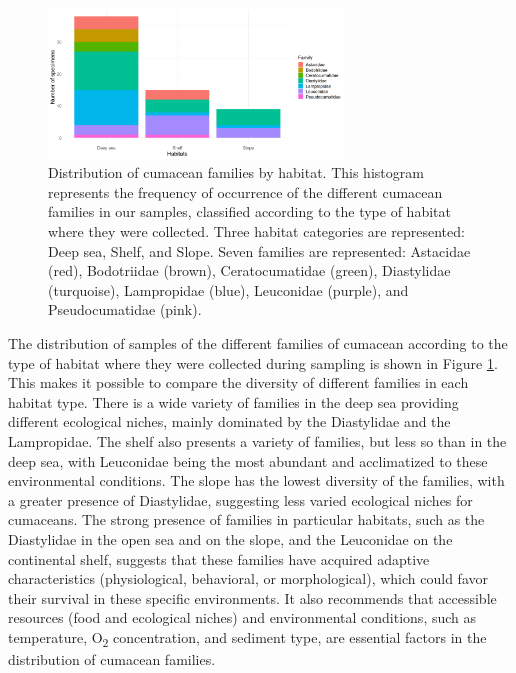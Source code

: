 \begin{figure}[]
    \centering
    \includegraphics[width=0.7\textwidth]{figure4.png}
    \caption{Distribution of cumacean families by habitat. This histogram represents the frequency of occurrence of the different cumacean families in our samples, classified according to the type of habitat where they were collected. Three habitat categories are represented: Deep sea, Shelf, and Slope. Seven families are represented: Astacidae (red), Bodotriidae (brown), Ceratocumatidae (green), Diastylidae (turquoise), Lampropidae (blue), Leuconidae (purple), and Pseudocumatidae (pink). \label{fig:fig4}}
\end{figure}

The distribution of samples of the different families of cumacean according to the type of habitat where they were collected during sampling is shown in Figure \ref{fig:fig4}. This makes it possible to compare the diversity of different families in each habitat type. There is a wide variety of families in the deep sea providing different ecological niches, mainly dominated by the Diastylidae and the Lampropidae. The shelf also presents a variety of families, but less so than in the deep sea, with Leuconidae being the most abundant and acclimatized to these environmental conditions. The slope has the lowest diversity of the families, with a greater presence of Diastylidae, suggesting less varied ecological niches for cumaceans. The strong presence of families in particular habitats, such as the Diastylidae in the open sea and on the slope, and the Leuconidae on the continental shelf, suggests that these families have acquired adaptive characteristics (physiological, behavioral, or morphological), which could favor their survival in these specific environments. It also recommends that accessible resources (food and ecological niches) and environmental conditions, such as temperature, O\textsubscript{2} concentration, and sediment type, are essential factors in the distribution of cumacean families.

